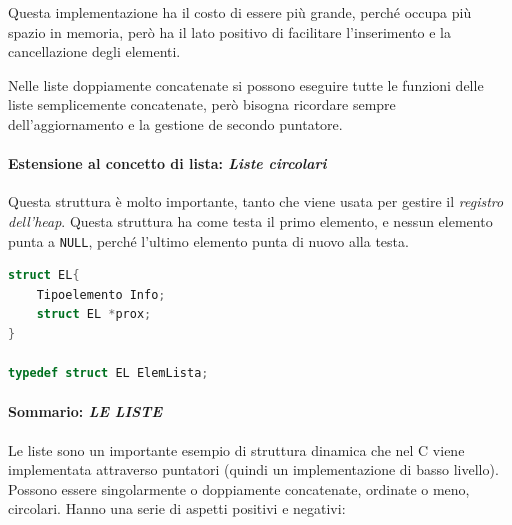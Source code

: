 \documentclass[
  paper=a4,
  oneside  ,captions=tableheading
]{scrbook}
\newcommand{\passthrough}[1]{#1}
\begin{document}
Questa implementazione ha il costo di essere più grande, perché occupa
più spazio in memoria, però ha il lato positivo di facilitare
l'inserimento e la cancellazione degli elementi.

Nelle liste doppiamente concatenate si possono eseguire tutte le
funzioni delle liste semplicemente concatenate, però bisogna ricordare
sempre dell'aggiornamento e la gestione de secondo puntatore.

\hypertarget{estensione-al-concetto-di-lista-liste-circolari}{%
\paragraph{\texorpdfstring{Estensione al concetto di lista: \emph{Liste
circolari}}{Estensione al concetto di lista: Liste circolari}}\label{estensione-al-concetto-di-lista-liste-circolari}}

Questa struttura è molto importante, tanto che viene usata per gestire
il \emph{registro dell'heap}. Questa struttura ha come testa il primo
elemento, e nessun elemento punta a \passthrough{\lstinline!NULL!},
perché l'ultimo elemento punta di nuovo alla testa.

\begin{lstlisting}[language=C]
struct EL{
    Tipoelemento Info;
    struct EL *prox;
}

typedef struct EL ElemLista;
\end{lstlisting}

\hypertarget{sommario-le-liste}{%
\paragraph{\texorpdfstring{Sommario: \emph{LE
LISTE}}{Sommario: LE LISTE}}\label{sommario-le-liste}}

Le liste sono un importante esempio di struttura dinamica che nel C
viene implementata attraverso puntatori (quindi un implementazione di
basso livello). Possono essere singolarmente o doppiamente concatenate,
ordinate o meno, circolari. Hanno una serie di aspetti positivi e
negativi:
\end{document}
